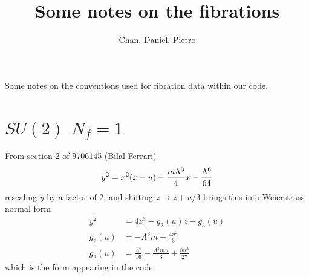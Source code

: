 \documentclass[11pt]{article}
\title{Some notes on the fibrations}
\author{Chan, Daniel, Pietro}
\newcommand{\be}{\begin{equation}}
\newcommand{\ee}{\end{equation}}
\begin{document}
\maketitle
\begin{center}
	Some notes on the conventions used for fibration data within our code.
\end{center}
\tableofcontents


\section{$SU(2)$ $N_{f}=1$}

From section 2 of 9706145 (Bilal-Ferrari)
\be
	y^{2} = x^{2}(x-u) + {m \Lambda^{3}\over 4} x - {\Lambda^{6}\over 64}
\ee
rescaling $y$ by a factor of $2$, and shifting $z \to z + u/3$ brings this into Weierstrass normal form
\be
\begin{split}
	y^{2} & = 4z^{3} - g_{2}(u) z - g_{3}(u) \\
	g_{2}(u) & = -\Lambda ^3 m+\frac{4 u^2}{3}\\
	g_{3}(u) & = \frac{\Lambda ^6}{16}-\frac{ \Lambda ^3 m u}{3} +\frac{8 u^3}{27}
\end{split}
\ee
which is the form appearing in the code.

\begin{comment}
From section 10.2 of GMN2
\be
	\lambda^{2} = \left( {\Lambda^{2} \over z^{3}} + {3 u\over z^{2}} + {2 m \Lambda^{} \over z^{}} + \Lambda^{2} \right)\, dz^{2}
\ee
upon a proper ($z$-dependent) rescaling od $\Lambda$, we may identify the elliptic curve
\be
	y^{2} = 4z^{3} + {8m\over \Lambda}z^{2}+{12 u\over \Lambda^{2}} z + 4
\ee
shifting $z \to z - 2m / 3\Lambda$ brings this into Weierstrass normal form
\be
\begin{split}
	y^{2} & = 4z^{3} - g_{2}(u) z - g_{3}(u) \\
	g_{2}(u) & = {16 m^{2} \over 3\Lambda^{2}} - {12 u \over \Lambda^{2}} \\
	g_{3}(u) & = {8 m u \over \Lambda^{3}} - {64 m^{3} \over 27 \Lambda^{3}} 
\end{split}
\ee
which is the form appearing in the code.
\end{comment}
\end{document}
